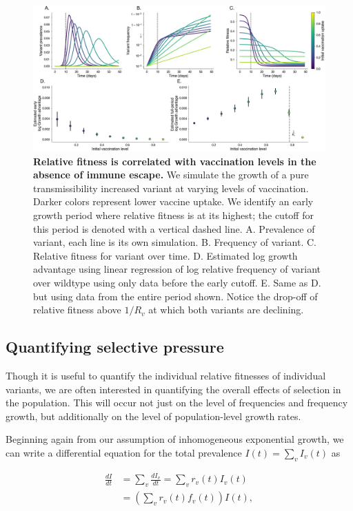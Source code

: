 \documentclass[12pt,oneside,letterpaper]{article}
\begin{document}
\begin{figure}[h]
    \centering
    \includegraphics[width=0.8\linewidth]{./figures/correlation_not_mechanism.png}
    \caption{\textbf{Relative fitness is correlated with vaccination levels in the absence of immune escape.}
    We simulate the growth of a pure transmissibility increased variant at varying levels of vaccination.
    Darker colors represent lower vaccine uptake.
    We identify an early growth period where relative fitness is at its highest; the cutoff for this period is denoted with a vertical dashed line.
        A. Prevalence of variant, each line is its own simulation.
        B. Frequency of variant.
        C. Relative fitness for variant over time.
        D. Estimated log growth advantage using linear regression of log relative frequency of variant over wildtype using only data before the early cutoff.
        E. Same as D. but using data from the entire period shown. Notice the drop-off of relative fitness above $1 / R_{v}$ at which both variants are declining.
    }
\label{fig:mechanism_identification}
\end{figure}

\subsection*{Quantifying selective pressure}

Though it is useful to quantify the individual relative fitnesses of individual variants, we are often interested in quantifying the overall effects of selection in the population.
This will occur not just on the level of frequencies and frequency growth, but additionally on the level of population-level growth rates.

Beginning again from our assumption of inhomogeneous exponential growth, we can write a differential equation for the total prevalence $I(t)= \sum_{v} I_{v}(t)$ as

\begin{align*}
    \frac{d I}{d t} &= \sum_{v} \frac{d I_{v}}{d t} =  \sum_{v} r_{v}(t) I_{v}(t)\\
                    &= \left( \sum_{v} r_{v}(t) f_{v}(t) \right) I(t),
\end{align*}
\end{document}
